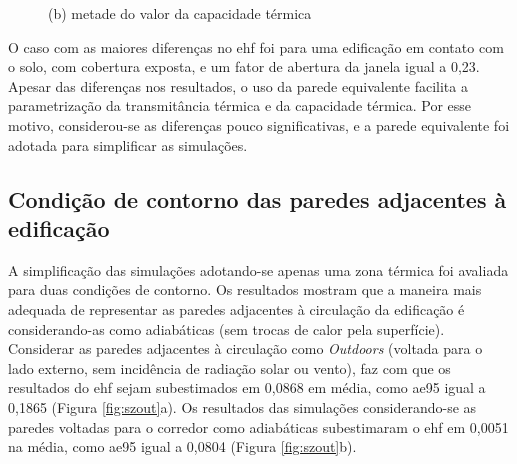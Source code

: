 \documentclass[brazil,hardcopy,openany]{ufscthesis} %
\begin{document}
\begin{figure}[h]
\begin{minipage}{.5\textwidth}
		\begin{center}
			\small{(b) metade do valor da capacidade térmica}\\
		\end{center}
	\end{minipage}
	\label{fig:par2_scatter}
\end{figure}

O caso com as maiores diferenças no \acrshort{ehf} foi para uma edificação em contato com o solo, com cobertura exposta, e um fator de abertura da janela igual a 0,23.
Apesar das diferenças nos resultados, o uso da parede equivalente facilita a parametrização da transmitância térmica e da capacidade térmica. Por esse motivo, considerou-se as diferenças pouco significativas, e a parede equivalente foi adotada para simplificar as simulações.

\subsection{Condição de contorno das paredes adjacentes à edificação}

A simplificação das simulações adotando-se apenas uma zona térmica foi avaliada para duas condições de contorno. Os resultados mostram que a maneira mais adequada de representar as paredes adjacentes à circulação da edificação é considerando-as como adiabáticas (sem trocas de calor pela superfície).
Considerar as paredes adjacentes à circulação como \textit{Outdoors} (voltada para o lado externo, sem incidência de radiação solar ou vento), faz com que os resultados do \acrshort{ehf} sejam subestimados em 0,0868 em média, como \acrshort{ae95} igual a 0,1865 (Figura \ref{fig:szout}a).
Os resultados das simulações considerando-se as paredes voltadas para o corredor como adiabáticas subestimaram o \acrshort{ehf} em 0,0051 na média, como \acrshort{ae95} igual a 0,0804 (Figura \ref{fig:szout}b).
\end{document}

